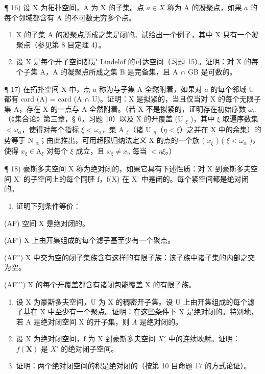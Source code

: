 ¶ 16) 设 X 为拓扑空间，A 为 X 的子集。点 \(a \in X\) 称为 A 的凝聚点，如果 \(a\) 的每个邻域都含有 A 的不可数无穷多个点。

\begin{enumerate}
\def\labelenumi{\alph{enumi})}
\item
  X 的子集 A 的凝聚点所成之集是闭的。试给出一个例子，其中 X 只有一个凝聚点（参见第 8 目定理 4）。
\item
  设 X 是每个开子空间都是 Lindelöf 的可达空间（习题 15）。证明：对 X 的每个子集 A，A 的凝聚点所成之集 B 是完备集，且 A ∩ GB 是可数的。
\end{enumerate}

¶ 17) 在拓扑空间 X 中，点 \(a\) 称为与子集 A 全然附着，如果对 \(a\) 的每个邻域 U 都有 card (A) = card (A ∩ U)。证明：X 是拟紧的，当且仅当对 X 的每个无限子集 A，存在 X 的一点与 A 全然附着。（若 X 不是拟紧的，证明存在初始序数 \(\omega_{\alpha}\)（《集合论》第三章，§ 6，习题 10）以及 X 的开覆盖 (U \(_{\xi}\) )，其中 \(\xi\) 取遍序数集 \(<\omega_{\alpha}\)，使得对每个指标 \(\xi<\omega_{\alpha}\)，集 A \(_{\xi}\)（诸 U \(_{\eta}\)（\(\eta<\xi\)）之并在 X 中的余集）的势等于 N \(_{\alpha}\)；由此推出，可用超限归纳法定义 X 的点的一个族 ( \(x_{\xi}\) ) ( \(\xi<\omega_{\alpha}\) )，使得 \(x_{\xi}\in\mathrm{A}_{\xi}\) 对每个 \(\xi\) 成立，且 \(x_{\xi}\neq x_{\eta}\) 每当 \(<\eta\xi\)。）

¶ 18) 豪斯多夫空间 X 称为绝对闭的，如果它具有下述性质：对 X 到豪斯多夫空间 X' 的子空间上的每个同胚 f，f(X) 在 X' 中是闭的。每个紧空间都是绝对闭的。

\begin{enumerate}
\def\labelenumi{\alph{enumi})}
\tightlist
\item
  证明下列条件等价：
\end{enumerate}

(AF) 空间 X 是绝对闭的。

(AF') X 上由开集组成的每个滤子基至少有一个聚点。

(AF'') X 中交为空的闭子集族含有这样的有限子族：该子族中诸子集的内部之交为空。

(AF''') X 的每个开覆盖都含有诸闭包能覆盖 X 的有限子族。

\begin{enumerate}
\def\labelenumi{\alph{enumi})}
\setcounter{enumi}{1}
\item
  设 X 为豪斯多夫空间，U 为 X 的稠密开子集。设 U 上由开集组成的每个滤子基在 X 中至少有一个聚点。证明：在这些条件下 X 是绝对闭的。特别地，若 A 是绝对闭空间 X 的开子集，则 \(\overline{A}\) 是绝对闭的。
\item
  设 X 为绝对闭空间，f 为 X 到豪斯多夫空间 \(X'\) 中的连续映射。证明：\(f(\mathbf{X})\) 是 \(X'\) 的绝对闭子空间。
\item
  证明：两个绝对闭空间的积是绝对闭的（按第 10 目命题 17 的方式论证）。
\end{enumerate}

